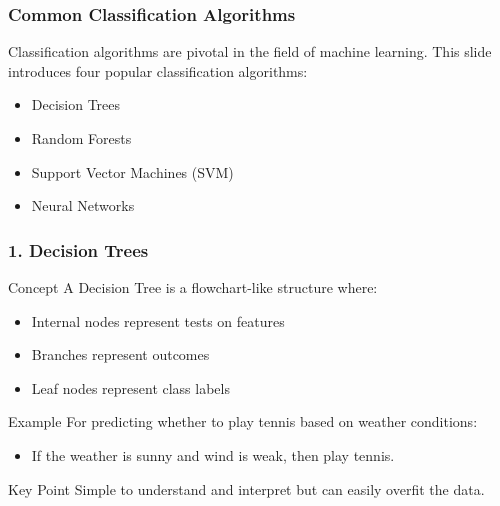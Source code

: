 \documentclass[aspectratio=169]{beamer}
\begin{document}
\begin{frame}[fragile]
    \frametitle{Common Classification Algorithms}
    Classification algorithms are pivotal in the field of machine learning. This slide introduces four popular classification algorithms:
    \begin{itemize}
        \item Decision Trees
        \item Random Forests
        \item Support Vector Machines (SVM)
        \item Neural Networks
    \end{itemize}
\end{frame}

\begin{frame}[fragile]
    \frametitle{1. Decision Trees}
    \begin{block}{Concept}
        A Decision Tree is a flowchart-like structure where:
        \begin{itemize}
            \item Internal nodes represent tests on features
            \item Branches represent outcomes
            \item Leaf nodes represent class labels
        \end{itemize}
    \end{block}

    \begin{block}{Example}
        For predicting whether to play tennis based on weather conditions:
        \begin{itemize}
            \item If the weather is sunny and wind is weak, then play tennis.
        \end{itemize}
    \end{block}

    \begin{block}{Key Point}
        Simple to understand and interpret but can easily overfit the data.
    \end{block}
\end{frame}
\end{document}
